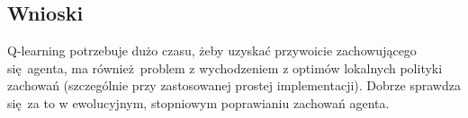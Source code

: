 \subsection{Wnioski}
Q-learning potrzebuje dużo czasu, żeby uzyskać przywoicie zachowującego się agenta, ma również problem z wychodzeniem z optimów lokalnych polityki zachowań (szczególnie przy zastosowanej prostej implementacji). Dobrze sprawdza się za to w ewolucyjnym, stopniowym poprawianiu zachowań agenta.
